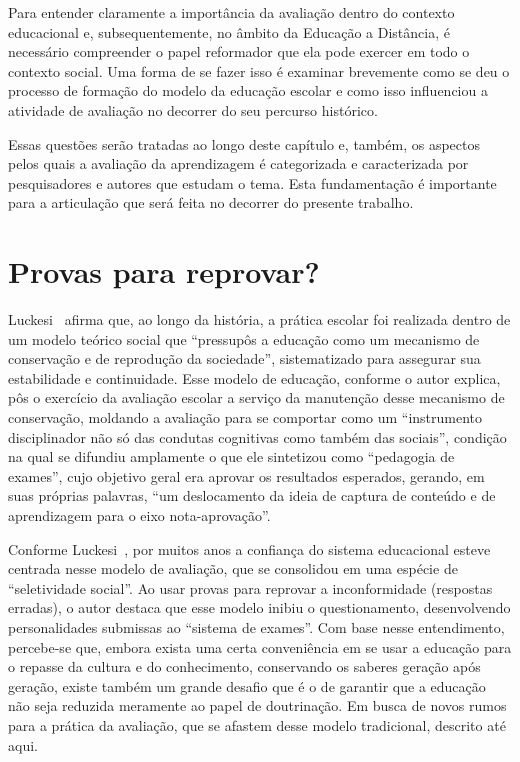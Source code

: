 \label{chap:ref}
Para entender claramente a importância da avaliação dentro do contexto educacional e, subsequentemente, no âmbito da Educação a Distância, é necessário compreender o papel reformador que ela pode exercer em todo o contexto social. Uma forma de se fazer isso é examinar brevemente como se deu o processo de formação do modelo da educação escolar e como isso influenciou a atividade de avaliação no decorrer do seu percurso histórico. 


Essas questões serão tratadas ao longo deste capítulo e, também, os aspectos pelos quais a avaliação da aprendizagem é categorizada e caracterizada por pesquisadores e autores que estudam o tema. Esta fundamentação é importante para a articulação que será feita no decorrer do presente trabalho.%

\section{Provas para reprovar?}%
 Luckesi~\cite{luckesi2014avaliaccao} afirma que, ao longo da história, a prática escolar foi realizada dentro de um modelo teórico social que ``pressupôs a educação como um mecanismo de conservação e de reprodução da sociedade'', sistematizado para assegurar sua estabilidade e continuidade. Esse modelo de educação, conforme o autor explica, pôs o exercício da avaliação escolar a serviço da manutenção desse mecanismo de conservação, moldando a avaliação para se comportar como um ``instrumento disciplinador não só das condutas cognitivas como também das sociais'', condição na qual se difundiu amplamente o que ele sintetizou como ``pedagogia de exames'', cujo objetivo geral era aprovar os resultados esperados, gerando, em suas próprias palavras, ``um deslocamento da ideia de captura de conteúdo e de aprendizagem para o eixo nota-aprovação''.

Conforme Luckesi~\cite{luckesi2014avaliaccao}, por muitos anos a confiança do sistema educacional esteve centrada nesse modelo de avaliação, que se consolidou em uma espécie de ``seletividade social''. Ao usar provas para reprovar a inconformidade (respostas erradas), o autor destaca que esse modelo inibiu o questionamento, desenvolvendo personalidades submissas ao ``sistema de exames''. Com base nesse entendimento, percebe-se que, embora exista uma certa conveniência em se usar a educação para o repasse da cultura e do conhecimento, conservando os saberes geração após geração, existe também um grande desafio que é o de garantir que a educação não seja reduzida meramente ao papel de doutrinação. Em busca de novos rumos para a prática da avaliação, que se afastem desse modelo tradicional, descrito até aqui. 

